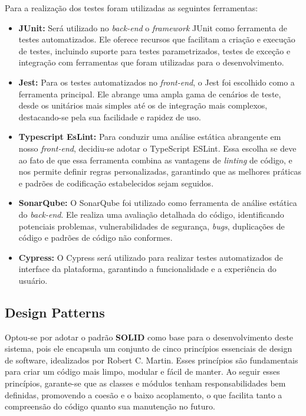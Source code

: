 Para a realização dos testes foram utilizadas as seguintes ferramentas:
 
\begin{itemize}
    \item \textbf{JUnit:}
     Será utilizado no \textit{back-end} o \textit{framework} JUnit como ferramenta de testes automatizados. Ele oferece recursos que facilitam a criação e execução de testes, incluindo suporte para testes parametrizados, testes de exceção e integração com ferramentas que foram utilizadas para o desenvolvimento.
    \item \textbf{Jest:}
    Para os testes automatizados no \textit{front-end}, o Jest foi escolhido como a ferramenta principal. Ele abrange uma ampla gama de cenários de teste, desde os unitários mais simples até os de integração mais complexos, destacando-se pela sua facilidade e rapidez de uso. 
    \item \textbf{Typescript EsLint:}
    Para conduzir uma análise estática abrangente em nosso \textit{front-end}, decidiu-se adotar o TypeScript ESLint. Essa escolha se deve ao fato de que essa ferramenta combina as vantagens de \textit{linting} de código, e nos permite definir regras personalizadas, garantindo que as melhores práticas e padrões de codificação estabelecidos sejam seguidos.
    \item \textbf{SonarQube:}
     O SonarQube foi utilizado como ferramenta de análise estática do \textit{back-end}. Ele realiza uma avaliação detalhada do código, identificando potenciais problemas, vulnerabilidades de segurança, \textit{bugs}, duplicações de código e padrões de código não conformes.
    \item \textbf{Cypress:}
    O Cypress será utilizado para realizar testes automatizados de interface da plataforma, garantindo a funcionalidade e a experiência do usuário.    
\end{itemize}
\subsection{Design Patterns}
Optou-se por adotar o padrão \textbf{SOLID} como base para o desenvolvimento deste sistema, pois ele encapsula um conjunto de cinco princípios essenciais de design de software, idealizados por Robert C. Martin. Esses princípios são fundamentais para criar um código mais limpo, modular e fácil de manter. Ao seguir esses princípios, garante-se que as classes e módulos tenham responsabilidades bem definidas, promovendo a coesão e o baixo acoplamento, o que facilita tanto a compreensão do código quanto sua manutenção no futuro. 

